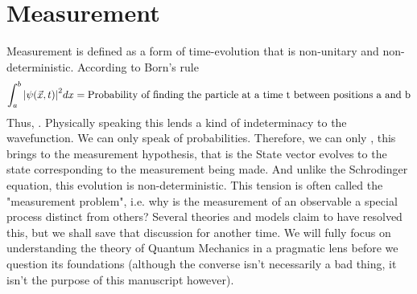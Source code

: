 \section{Measurement}
Measurement is defined as a form of time-evolution that is non-unitary and non-deterministic. 
According to Born's rule
\begin{equation}
	\int_{a}^{b} \abs{\psi(\vec{x}, t)}^{2} dx = \text{Probability of finding the particle at a time t between positions a and b}
\end{equation}
Thus, . Physically speaking this lends a kind of indeterminacy to the wavefunction. We can only speak of probabilities. Therefore, we can only , this brings to the measurement hypothesis, that is the State vector evolves to the state corresponding to the measurement being made. And unlike the Schrodinger equation, this evolution is non-deterministic. This tension is often called the "measurement problem", i.e. why is the measurement of an observable a special process distinct from others? Several theories and models claim to have resolved this, but we shall save that discussion for another time. We will fully focus on understanding the theory of Quantum Mechanics in a pragmatic lens before we question its foundations (although the converse isn't necessarily a bad thing, it isn't the purpose of this manuscript however).

